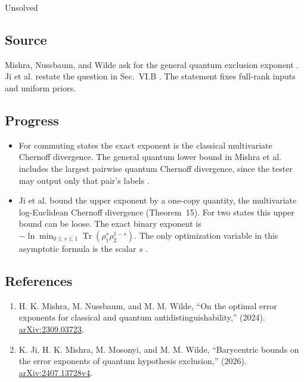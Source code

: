 Unsolved

\subsection*{Source}

Mishra, Nussbaum, and Wilde ask for the general quantum exclusion exponent . Ji et al. restate the question in Sec.~VI.B . The statement fixes full-rank inputs and uniform priors.

\subsection*{Progress}

\begin{itemize}
  \item For commuting states the exact exponent is the classical multivariate Chernoff divergence. The general quantum lower bound in Mishra et al. includes the largest pairwise quantum Chernoff divergence, since the tester may output only that pair's labels .

  \item Ji et al. bound the upper exponent by a one-copy quantity, the multivariate log-Euclidean Chernoff divergence (Theorem~15). For two states this upper bound can be loose. The exact binary exponent is $-\ln\min_{0\leq s\leq 1}\operatorname{Tr}(\rho_1^s\rho_2^{1-s})$. The only optimization variable in this asymptotic formula is the scalar $s$ .
\end{itemize}

\subsection*{References}

\begin{enumerate}[label={},leftmargin=4.8em,labelsep=0.5em]
  \footnotesize
  \item[\textup{[MNW24]}]\label{ref:d10-02-mnw24}
  H. K. Mishra, M. Nussbaum, and M. M. Wilde, ``On the optimal error exponents for classical and quantum antidistinguishability,'' (2024). \href{https://arxiv.org/abs/2309.03723}{arXiv:2309.03723}.

  \item[\textup{[JMMW26]}]\label{ref:d10-02-jmmw26}
  K. Ji, H. K. Mishra, M. Mosonyi, and M. M. Wilde, ``Barycentric bounds on the error exponents of quantum hypothesis exclusion,'' (2026). \href{https://arxiv.org/abs/2407.13728v4}{arXiv:2407.13728v4}.
\end{enumerate}

